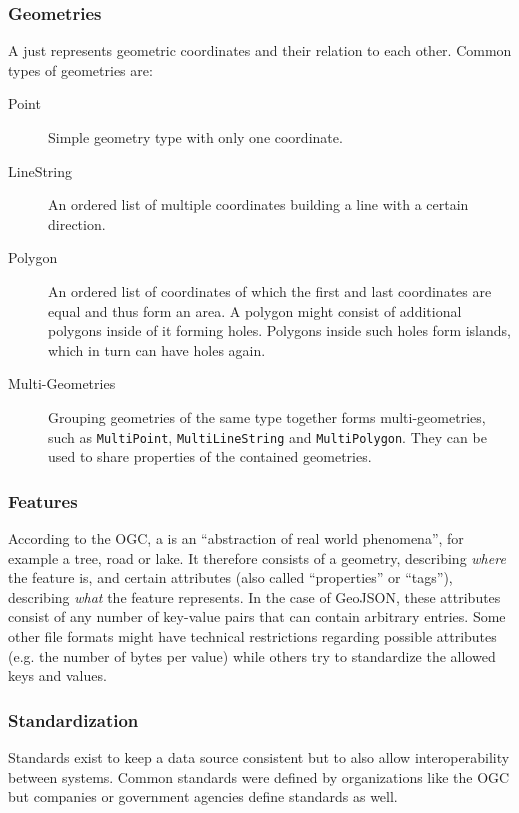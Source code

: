 		\subsubsection{Geometries}
		
			A  just represents geometric coordinates and their relation to each other.
			Common types of geometries are:
			\begin{description}
				\item[Point] Simple geometry type with only one coordinate.
				\item[LineString] An ordered list of multiple coordinates building a line with a certain direction.
				\item[Polygon] An ordered list of coordinates of which the first and last coordinates are equal and thus form an area. A polygon might consist of additional polygons inside of it forming holes. Polygons inside such holes form islands, which in turn can have holes again.
				\item[Multi-Geometries] Grouping geometries of the same type together forms multi-geometries, such as \texttt{MultiPoint}, \texttt{MultiLineString} and \texttt{MultiPolygon}. They can be used to share properties of the contained geometries.
			\end{description}
		
		\subsubsection{Features}
		
			According to the OGC, a  is an \enquote{abstraction of real world phenomena}\cite{ogc-sfa}, for example a tree, road or lake.
			It therefore consists of a geometry, describing \textit{where} the feature is, and certain attributes (also called \enquote{properties} or \enquote{tags}), describing \textit{what} the feature represents.
			In the case of GeoJSON, these attributes consist of any number of key-value pairs that can contain arbitrary entries.
			Some other file formats might have technical restrictions regarding possible attributes (e.g. the number of bytes per value) while others try to standardize the allowed keys and values.
		
		\subsubsection{Standardization}
		
			Standards exist to keep a data source consistent but to also allow interoperability between systems.
			Common standards were defined by organizations like the OGC but companies or government agencies define standards as well.
			
